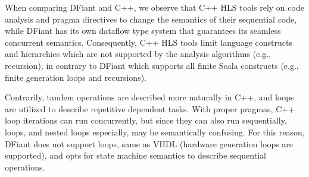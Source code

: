 When comparing DFiant and C++, we observe that C++ HLS tools rely on code analysis and pragma directives to change the semantics of their sequential code, while DFiant has its own dataflow type system that guarantees its seamless concurrent semantics. Consequently, C++ HLS tools limit language constructs and hierarchies which are not supported by the analysis algorithms (e.g., recursion), in contrary to DFiant which supports all finite Scala constructs (e.g., finite generation loops and recursions). 

Contrarily, tandem operations are described more naturally in C++, and loops are utilized to describe repetitive dependent tasks. With proper pragmas, C++ loop iterations can run concurrently, but since they can also run sequentially, loops, and nested loops especially, may be semantically confusing. For this reason, DFiant does not support loops, same as VHDL (hardware generation loops are supported), and opts for state machine semantics to describe sequential operations. %
